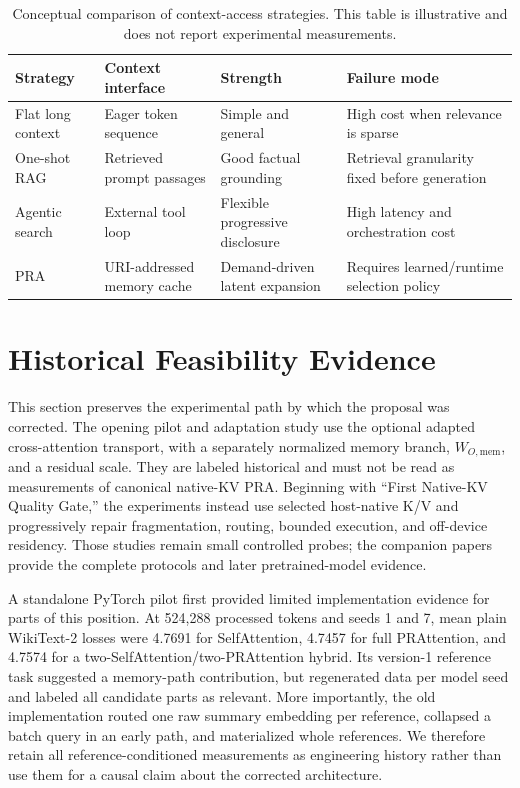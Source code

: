 \documentclass[11pt]{article}
\begin{document}
\begin{table}[ht]
\centering
\caption{Conceptual comparison of context-access strategies. This table is illustrative and does not report experimental measurements.}
\label{tab:conceptual}
\begin{tabularx}{\linewidth}{@{}lXXX@{}}
\toprule
Strategy & Context interface & Strength & Failure mode \\
\midrule
Flat long context & Eager token sequence & Simple and general & High cost when relevance is sparse \\
One-shot RAG & Retrieved prompt passages & Good factual grounding & Retrieval granularity fixed before generation \\
Agentic search & External tool loop & Flexible progressive disclosure & High latency and orchestration cost \\
PRA & URI-addressed memory cache & Demand-driven latent expansion & Requires learned/runtime selection policy \\
\bottomrule
\end{tabularx}
\end{table}

\iffalse
\section{Historical Feasibility Evidence}

This section preserves the experimental path by which the proposal was corrected. The
opening pilot and adaptation study use the optional adapted cross-attention transport,
with a separately normalized memory branch, $W_{O,\mathrm{mem}}$, and a residual scale.
They are labeled historical and must not be read as measurements of canonical native-KV
PRA. Beginning with ``First Native-KV Quality Gate,'' the experiments instead use selected
host-native K/V and progressively repair fragmentation, routing, bounded execution, and
off-device residency. Those studies remain small controlled probes; the companion papers
provide the complete protocols and later pretrained-model evidence.

A standalone PyTorch pilot first provided limited implementation evidence for parts of this position. At 524,288 processed tokens and seeds 1 and 7, mean plain WikiText-2 losses were 4.7691 for SelfAttention, 4.7457 for full PRAttention, and 4.7574 for a two-SelfAttention/two-PRAttention hybrid. Its version-1 reference task suggested a memory-path contribution, but regenerated data per model seed and labeled all candidate parts as relevant. More importantly, the old implementation routed one raw summary embedding per reference, collapsed a batch query in an early path, and materialized whole references. We therefore retain all reference-conditioned measurements as engineering history rather than use them for a causal claim about the corrected architecture.
\end{document}
